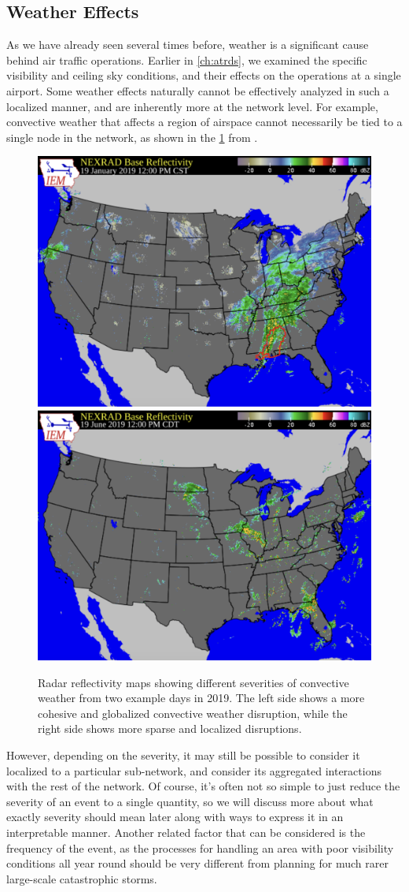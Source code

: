 \subsection{Weather Effects}

As we have already seen several times before, weather is a significant cause behind air traffic operations. Earlier in \cref{ch:atrds}, we examined the specific visibility and ceiling sky conditions, and their effects on the operations at a single airport. Some weather effects naturally cannot be effectively analyzed in such a localized manner, and are inherently more at the network level. For example, convective weather that affects a region of airspace cannot necessarily be tied to a single node in the network, as shown in the \cref{fig:nexrad-example} from \cite{iem_nexrad_mosaic}.

\begin{figure}[htb!]
    \centering
    \includegraphics[width=0.49\linewidth]{media/nexrad_2019_01_19_12pm.png}
    \includegraphics[width=0.49\linewidth]{media/nexrad_2019_06_19_12pm.png}
    \caption{Radar reflectivity maps showing different severities of convective weather from two example days in 2019. The left side shows a more cohesive and globalized convective weather disruption, while the right side shows more sparse and localized disruptions.}
    \label{fig:nexrad-example}
\end{figure}

However, depending on the severity, it may still be possible to consider it localized to a particular sub-network, and consider its aggregated interactions with the rest of the network. Of course, it's often not so simple to just reduce the severity of an event to a single quantity, so we will discuss more about what exactly severity should mean later along with ways to express it in an interpretable manner. Another related factor that can be considered is the frequency of the event, as the processes for handling an area with poor visibility conditions all year round should be very different from planning for much rarer large-scale catastrophic storms.

